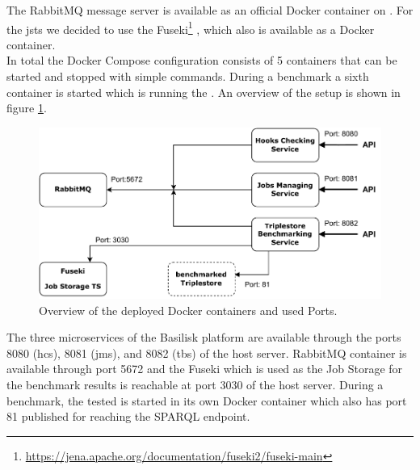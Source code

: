 The RabbitMQ message server is available as an official Docker container on \dockh{}.
For the \ac{jsts} we decided to use the Fuseki\footnote{\url{https://jena.apache.org/documentation/fuseki2/fuseki-main}} \ts{}, which also is available as a Docker container.
\\

In total the Docker Compose configuration consists of 5 containers that can be started and stopped with simple commands.
During a benchmark a sixth container is started which is running the \ts{}.
An overview of the setup is shown in figure \ref{fig:docker-setup}. 

\begin{figure}[tbph]
	\centering
	\includegraphics[width=.7\textwidth]{figures/docker-setup.pdf}
	\caption{Overview of the deployed Docker containers and used Ports.}
	\label{fig:docker-setup}
\end{figure}

The three microservices of the Basilisk platform are available through the ports 8080 (\ac{hcs}), 8081 (\ac{jms}), and 8082 (\ac{tbs}) of the host server.
RabbitMQ container is available through port 5672 and the Fuseki \ts{} which is used as the Job Storage for the benchmark results is reachable at port 3030 of the host server.
During a benchmark, the tested \ts{} is started in its own Docker container which also has port 81 published for reaching the SPARQL endpoint.